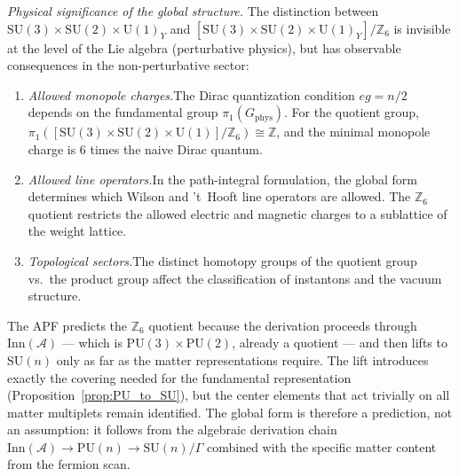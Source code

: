 \documentclass[11pt,a4paper]{article}
\theoremstyle{definition}
\newcommand{\SU}{\mathrm{SU}}
\newcommand{\U}{\mathrm{U}}
\begin{document}
\smallskip\noindent\textit{Physical significance of the global
structure.}\quad
The distinction between $\SU(3) \times \SU(2) \times \U(1)_Y$ and
$[\SU(3) \times \SU(2) \times \U(1)_Y] / \mathbb{Z}_6$ is invisible
at the level of the Lie algebra (perturbative physics), but has
observable consequences in the non-perturbative sector:
\begin{enumerate}[label=(\alph*),nosep]
  \item \textit{Allowed monopole charges.}\quad The Dirac quantization
  condition $eg = n/2$ depends on the fundamental group
  $\pi_1(G_{\mathrm{phys}})$.  For the quotient group,
  $\pi_1([\SU(3) \times \SU(2) \times \U(1)] / \mathbb{Z}_6) \cong
  \mathbb{Z}$, and the minimal monopole charge is $6$ times the naive
  Dirac quantum.
  \item \textit{Allowed line operators.}\quad In the path-integral
  formulation, the global form determines which Wilson and 't~Hooft
  line operators are allowed.  The $\mathbb{Z}_6$ quotient restricts
  the allowed electric and magnetic charges to a sublattice of the
  weight lattice.
  \item \textit{Topological sectors.}\quad The distinct homotopy
  groups of the quotient group vs.\ the product group affect the
  classification of instantons and the vacuum structure.
\end{enumerate}
The APF predicts the $\mathbb{Z}_6$ quotient because the derivation
proceeds through $\mathrm{Inn}(\mathcal{A})$ --- which is
$\mathrm{PU}(3) \times \mathrm{PU}(2)$, already a quotient --- and
then lifts to $\SU(n)$ only as far as the matter representations
require.  The lift introduces exactly the covering needed for the
fundamental representation (Proposition~\ref{prop:PU_to_SU}), but the
center elements that act trivially on all matter multiplets remain
identified.  The global form is therefore a prediction, not an
assumption: it follows from the algebraic derivation chain
$\mathrm{Inn}(\mathcal{A}) \to \mathrm{PU}(n) \to \SU(n) / \Gamma$
combined with the specific matter content from the fermion scan.
\end{document}
